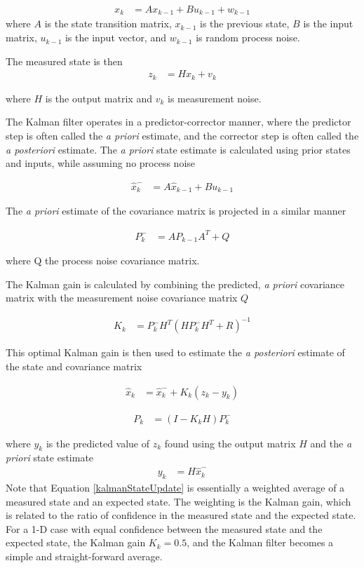 \begin{align}
x_k &= Ax_{k-1} + Bu_{k-1}+w_{k-1}
\end{align}
where $A$ is the state transition matrix, $x_{k-1}$ is the previous state, $B$ is the input matrix, $u_{k-1}$ is the input vector, and $w_{k-1}$ is random process noise.

The measured state is then 
\begin{align}
z_k &= Hx_k+v_k
\end{align} 

where $H$ is the output matrix and $v_k$ is measurement noise.

\indent
The Kalman filter operates in a predictor-corrector manner, where the predictor step is often called the \textit{a priori} estimate, and the corrector step is often called the \textit{a posteriori} estimate. The \textit{a priori} state estimate is calculated using prior states and inputs, while assuming no process noise

\begin{align}
\hat{x}^-_k &= A\hat{x}_{k-1}+Bu_{k-1}
\end{align}



The \textit{a priori} estimate of the covariance matrix is projected in a similar manner

\begin{align}
P^-_k &= AP_{k-1}A^T+Q
\end{align}

where Q the process noise covariance matrix.

The Kalman gain is calculated by combining the predicted, \textit{a priori} covariance matrix with the measurement noise covariance matrix $Q$

\begin{align}
K_k &=P^-_kH^T(HP^-_kH^T + R)^{-1}
\end{align}

This optimal Kalman gain is then used to estimate the \textit{a posteriori} estimate of the state and covariance matrix

\begin{align}
\label{kalmanStateUpdate}
\hat{x}_k &=\hat{x}^-_k+K_k(z_k-y_k)
\end{align}

\begin{align}
P_k &= (I-K_kH)P^-_k
\end{align}

where $y_k$ is the predicted value of $z_k$ found using the output matrix $H$ and the \textit{a priori} state estimate
\begin{align}
y_k &= H\hat{x}^-_k
\end{align}
Note that Equation \ref{kalmanStateUpdate} is essentially a weighted average of a measured state and an expected state. The weighting is the Kalman gain, which is related to the ratio of confidence in the measured state and the expected state. For a 1-D case with equal confidence between the measured state and the expected state, the Kalman gain $K_k = 0.5$, and the Kalman filter becomes a simple and straight-forward average.



